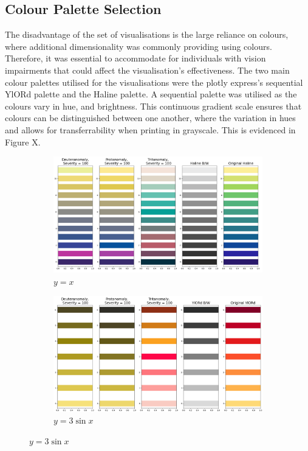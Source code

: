 \documentclass[12pt,a4paper]{article}
\begin{document}
\subsection{Colour Palette Selection}
The disadvantage of the set of visualisations is the large reliance on colours, where additional dimensionality was commonly providing using colours. Therefore, it was essential to accommodate for individuals with vision impairments that could affect the visualisation's effectiveness. 
The two main colour palettes utilised for the visualisations were the plotly express's sequential YlORd palette and the Haline palette.  A sequential palette was utilised as the colours vary in hue, and brightness. This continuous gradient scale ensures that colours can be distinguished between one another, where the variation in hues and allows for transferrability when printing in grayscale. This is evidenced in Figure X. 


\noindent
\begin{figure}[H]
     \centering
     \begin{subfigure}[b]{0.45\textwidth}
         \centering
         \includegraphics[width=\textwidth]{colour_blindness_haline.png}
         \caption{$y=x$}
         \label{fig:y equals x}
     \end{subfigure}
     \hfill
     \begin{subfigure}[b]{0.45\textwidth}
         \centering
         \includegraphics[width=\textwidth]{red_palette.png}
         \caption{$y=3\sin x$}
         \label{fig:three sin x}
     \end{subfigure}
\end{figure}
\end{document}
